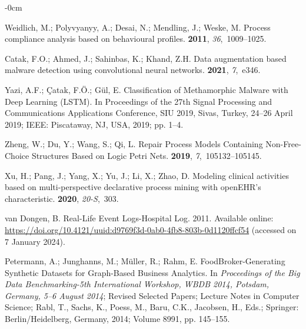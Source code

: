 \documentclass[information,article,accept,pdftex,oneauthor]{Definitions/mdpi}
\begin{document}
\begin{adjustwidth}{-\extralength}{0cm}
\begin{thebibliography}{999}
Weidlich, M.; Polyvyanyy, A.; Desai, N.; Mendling, J.; Weske, M.
\newblock Process compliance analysis based on behavioural profiles.
 {\bf 2011}, {\em 36},~1009--1025.

Catak, F.O.; Ahmed, J.; Sahinbas, K.; Khand, Z.H.
\newblock Data augmentation based malware detection using convolutional neural
  networks.
 {\bf 2021}, {\em 7},~e346.

Yazi, A.F.; {\c{C}}atak, F.{\"{O}}.; G{\"{u}}l, E.
\newblock Classification of Methamorphic Malware with Deep Learning (LSTM).
\newblock In Proceedings of the 27th Signal Processing and Communications
  Applications Conference, {SIU} 2019, Sivas, Turkey, 24--26 April  2019;
  {IEEE}:  {Piscataway, NJ, USA,} 2019; pp. 1--4.

Zheng, W.; Du, Y.; Wang, S.; Qi, L.
\newblock Repair Process Models Containing Non-Free-Choice Structures Based on
  Logic Petri Nets.
 {\bf 2019}, {\em 7},~105132--105145.

Xu, H.; Pang, J.; Yang, X.; Yu, J.; Li, X.; Zhao, D.
\newblock Modeling clinical activities based on multi-perspective declarative
  process mining with openEHR's characteristic.
 {\bf 2020}, {\em
  20-S},~303.

van Dongen, B.
\newblock Real-Life Event Logs-Hospital Log.  2011.  Available online: 
\newblock
  {\url{https://doi.org/10.4121/uuid:d9769f3d-0ab0-4fb8-803b-0d1120ffcf54}}  {(accessed on 7 January 2024).} %


Petermann, A.; Junghanns, M.; M{\"{u}}ller, R.; Rahm, E.
\newblock FoodBroker-Generating Synthetic Datasets for Graph-Based Business
  Analytics.
\newblock In \emph{Proceedings of the Big Data Benchmarking-5th International
  Workshop, {WBDB} 2014, Potsdam, Germany, 5--6 August  2014}; Revised Selected
  Papers; Lecture Notes in Computer Science; Rabl, T., Sachs, K., Poess, M., Baru, C.K., Jacobsen, H., Eds.;
  Springer:  {Berlin/Heidelberg, Germany,}   2014; Volume 8991, pp.  145--155.


\end{thebibliography}
\end{adjustwidth}
\end{document}
